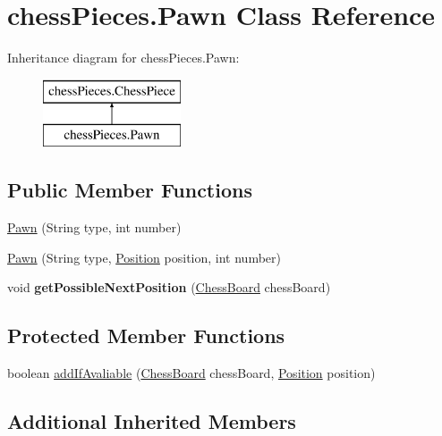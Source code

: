 \hypertarget{classchess_pieces_1_1_pawn}{\section{chess\+Pieces.\+Pawn Class Reference}
\label{classchess_pieces_1_1_pawn}
}
Inheritance diagram for chess\+Pieces.\+Pawn\+:\begin{figure}[H]
\begin{center}
\leavevmode
\includegraphics[height=2.000000cm]{classchess_pieces_1_1_pawn}
\end{center}
\end{figure}
\subsection*{Public Member Functions}
\begin{DoxyCompactItemize}
\item 
\hyperlink{classchess_pieces_1_1_pawn_a7cb5f02c0e0dd7707d4d3abdf7161c84}{Pawn} (String type, int number)
\item 
\hyperlink{classchess_pieces_1_1_pawn_a2c4bdb4c195fbd53e4cea91dd4cab53c}{Pawn} (String type, \hyperlink{classmodels_1_1_position}{Position} position, int number)
\item 
\hypertarget{classchess_pieces_1_1_pawn_acbb0a17aaac9f15f5e7d33c94e9f47ed}{void {\bfseries get\+Possible\+Next\+Position} (\hyperlink{classmodels_1_1_chess_board}{Chess\+Board} chess\+Board)}\label{classchess_pieces_1_1_pawn_acbb0a17aaac9f15f5e7d33c94e9f47ed}

\end{DoxyCompactItemize}
\subsection*{Protected Member Functions}
\begin{DoxyCompactItemize}
\item 
boolean \hyperlink{classchess_pieces_1_1_pawn_a5788751e93b88159665f3533b3b5b311}{add\+If\+Avaliable} (\hyperlink{classmodels_1_1_chess_board}{Chess\+Board} chess\+Board, \hyperlink{classmodels_1_1_position}{Position} position)
\end{DoxyCompactItemize}
\subsection*{Additional Inherited Members}


